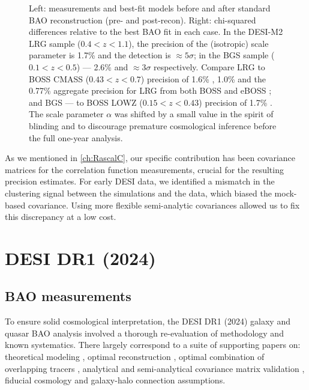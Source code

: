 \begin{figure}[htbp]
{    Left: measurements and best-fit models before and after standard BAO reconstruction (pre- and post-recon).
    Right: chi-squared differences relative to the best BAO fit in each case.
    In the DESI-M2 LRG sample ($0.4<z<1.1$), the precision of the (isotropic) scale parameter is 1.7\% and the detection is $\approx 5\sigma$; in the BGS sample ($0.1<z<0.5$) --- 2.6\% and $\approx 3\sigma$ respectively.
    Compare LRG to BOSS CMASS ($0.43<z<0.7$) precision of 1.6\% \citep[DR9,][]{BOSS-DR9-clustering}, 1.0\% \citep[DR12,][]{SDSS3-Ross17} and the 0.77\% aggregate precision for LRG from both BOSS and eBOSS \citep{SDSS4-eBOSS-Alam21}; and BGS --- to BOSS LOWZ ($0.15<z<0.43$) precision of 1.7\% \citep[DR12,][]{SDSS3-Ross17}.
    The scale parameter $\alpha$ was shifted by a small value in the spirit of blinding and to discourage premature cosmological inference before the full one-year analysis.}
    \label{fig:DESI-M2-BAO}
\end{figure}

As we mentioned in \cref{ch:RascalC}, our specific contribution has been covariance matrices for the correlation function measurements, crucial for the resulting precision estimates.
For early DESI data, we identified a mismatch in the clustering signal between the simulations and the data, which biased the mock-based covariance.
Using more flexible semi-analytic covariances allowed us to fix this discrepancy at a low cost.

\section{DESI DR1 (2024)}

\subsection{BAO measurements}

To ensure solid cosmological interpretation, the DESI DR1 (2024) galaxy and quasar BAO analysis \citep{DESI2024.III.KP4} involved a thorough re-evaluation of methodology and known systematics.
There largely correspond to a suite of supporting papers on:
theoretical modeling \citep{KP4s2-Chen},
optimal reconstruction \citep{KP4s4-Paillas,KP4s3-Chen},
optimal combination of overlapping tracers \citep{KP4s5-Valcin},
analytical \citep{KP4s8-Alves} and semi-analytical \citep[\cref{ch:RascalC},][]{KP4s7-Rashkovetskyi} covariance matrix validation \citep{KP4s6-Forero-Sanchez},
fiducial cosmology \citep{KP4s9-Perez-Fernandez}
and galaxy-halo connection \citep{KP4s10-Mena-Fernandez,KP4s11-Garcia-Quintero} assumptions.

